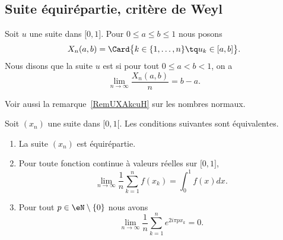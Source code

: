 \subsection{Suite équirépartie, critère de Weyl}

\begin{definition}
	Soit \( u\) une suite dans \( \mathopen[ 0 , 1 \mathclose]\). Pour \( 0\leq a\leq b\leq 1\) nous posons
	\begin{equation}
		X_n(a,b)=\Card\big\{  k\in\{ 1,\ldots, n \}\tq u_k\in\mathopen[ a , b \mathclose] \big\}.
	\end{equation}
	Nous disons que la suite \( u\) est  si pour tout \( 0\leq a<b<1\), on a
	\begin{equation}
		\lim_{n\to \infty} \frac{ X_n(a,b) }{ n }=b-a.
	\end{equation}
\end{definition}
Voir aussi la remarque~\ref{RemUXAkcuH} sur les nombres normaux.

\begin{proposition}  \label{PropDMvPDc}
	Soit \( (x_n)\) une suite dans \( \mathopen[ 0 , 1 [\). Les conditions suivantes sont équivalentes.
	\begin{enumerate}
		\item   \label{ItemKWcZTHqi}
		      La suite \( (x_n)\) est équirépartie.
		      \item\label{ItemKWcZTHqii}
		      Pour toute fonction continue à valeurs réelles sur \( \mathopen[ 0 , 1 \mathclose]\),
		      \begin{equation}    \label{EqBSqdjpn}
			      \lim_{n\to \infty} \frac{1}{ n }\sum_{k=1}^nf(x_k)=\int_0^1f(x)dx.
		      \end{equation}
		      \item\label{ItemKWcZTHqiii}
		      Pour tout \( p\in\eN\setminus\{ 0 \}\) nous avons
		      \begin{equation}
			      \lim_{n\to \infty} \frac{1}{ n }\sum_{k=1}^n e^{2i\pi px_k}=0.
		      \end{equation}
	\end{enumerate}
\end{proposition}

